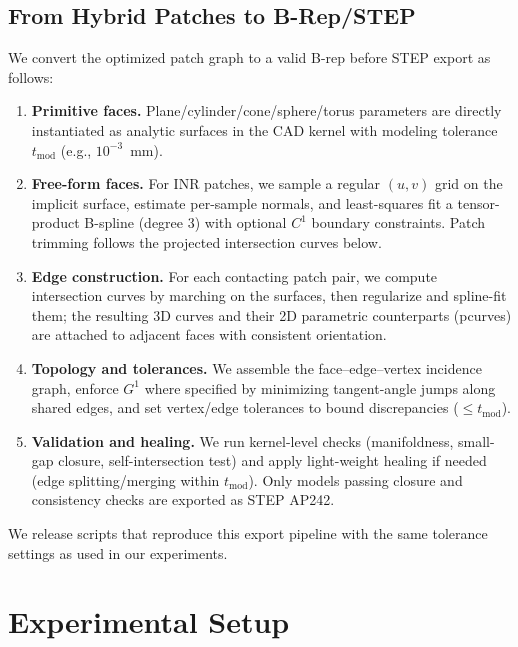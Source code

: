 \documentclass{ieeeaccess}
\begin{document}
\subsection{From Hybrid Patches to B-Rep/STEP}
\label{sec:brep_export}
We convert the optimized patch graph to a valid B-rep before STEP export as follows:
\begin{enumerate}
  \item \textbf{Primitive faces.} Plane/cylinder/cone/sphere/torus parameters are directly instantiated as analytic surfaces in the CAD kernel with modeling tolerance $t_{\mathrm{mod}}$ (e.g., $10^{-3}$~mm).
  \item \textbf{Free-form faces.} For INR patches, we sample a regular $(u,v)$ grid on the implicit surface, estimate per-sample normals, and least-squares fit a tensor-product B-spline (degree 3) with optional $C^1$ boundary constraints. Patch trimming follows the projected intersection curves below.
  \item \textbf{Edge construction.} For each contacting patch pair, we compute intersection curves by marching on the surfaces, then regularize and spline-fit them; the resulting 3D curves and their 2D parametric counterparts (pcurves) are attached to adjacent faces with consistent orientation.
  \item \textbf{Topology and tolerances.} We assemble the face–edge–vertex incidence graph, enforce $G^1$ where specified by minimizing tangent-angle jumps along shared edges, and set vertex/edge tolerances to bound discrepancies ($\le t_{\mathrm{mod}}$).
  \item \textbf{Validation and healing.} We run kernel-level checks (manifoldness, small-gap closure, self-intersection test) and apply light-weight healing if needed (edge splitting/merging within $t_{\mathrm{mod}}$). Only models passing closure and consistency checks are exported as STEP AP242.
\end{enumerate}
We release scripts that reproduce this export pipeline with the same tolerance settings as used in our experiments.


\section{Experimental Setup}
\label{sec:setup}
\end{document}

